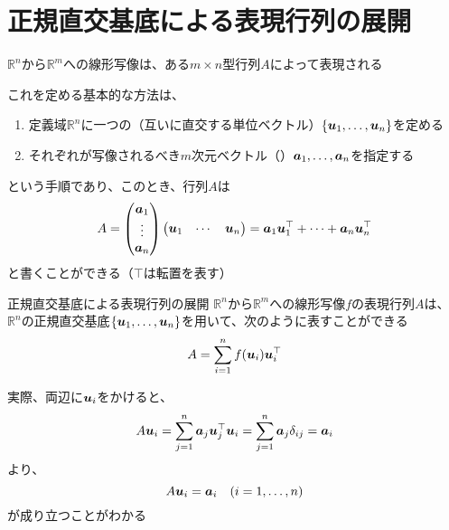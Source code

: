 \documentclass[../../../topic_linear-algebra]{subfiles}
\begin{document}
\sectionline
\section{正規直交基底による表現行列の展開}

$\mathbb{R}^n$から$\mathbb{R}^m$への線形写像は、ある$m \times n$型行列$A$によって表現される

\br

これを定める基本的な方法は、
\begin{enumerate}
  \item 定義域$\mathbb{R}^n$に一つの（互いに直交する単位ベクトル）$\{\vb*{u}_1,\ldots,\vb*{u}_n\}$を定める
  \item それぞれが写像されるべき$m$次元ベクトル（）$\vb*{a}_1,\ldots,\vb*{a}_n$を指定する
\end{enumerate}
という手順であり、このとき、行列$A$は
\begin{equation*}
  A = \begin{pmatrix}
    \vb*{a}_1 \\
    \vdots    \\
    \vb*{a}_n
  \end{pmatrix} \begin{pmatrix}
    \vb*{u}_1 & \cdots & \vb*{u}_n
  \end{pmatrix} = \vb*{a}_1 \vb*{u}_1^\top + \cdots + \vb*{a}_n \vb*{u}_n^\top
\end{equation*}
と書くことができる（$\top$は転置を表す）

\begin{theorem}{正規直交基底による表現行列の展開}\label{thm:orthobasis-formula-for-rep-matrix}
  $\mathbb{R}^n$から$\mathbb{R}^m$への線形写像$f$の表現行列$A$は、$\mathbb{R}^n$の正規直交基底$\{\vb*{u}_1,\ldots,\vb*{u}_n\}$を用いて、次のように表すことができる
  \begin{equation*}
    A = \sum_{i=1}^n f(\vb*{u}_i) \vb*{u}_i^\top
  \end{equation*}
\end{theorem}

実際、両辺に$\vb*{u}_i$をかけると、
\begin{equation*}
  A \vb*{u}_i = \sum_{j=1}^n \vb*{a}_j \vb*{u}_j^\top \vb*{u}_i
  = \sum_{j=1}^n \vb*{a}_j \delta_{ij}
  = \vb*{a}_i
\end{equation*}
より、
\begin{equation*}
  A \vb*{u}_i = \vb*{a}_i \quad (i = 1, \ldots, n)
\end{equation*}
が成り立つことがわかる
\end{document}
